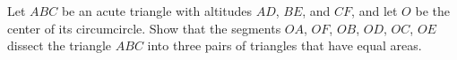 Let $ABC$ be an acute triangle with altitudes $AD$, $BE$, and $CF$, and let $O$ be the center of its circumcircle. Show that the segments $OA$, $OF$, $OB$, $OD$, $OC$, $OE$ dissect the triangle $ABC$ into three pairs of triangles that have equal areas.
